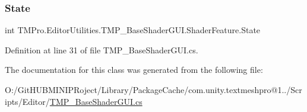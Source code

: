 \subsubsection{\texorpdfstring{State}{State}}
{\footnotesize\ttfamily int T\+M\+Pro.\+Editor\+Utilities.\+T\+M\+P\+\_\+\+Base\+Shader\+G\+U\+I.\+Shader\+Feature.\+State\hspace{0.3cm}{\ttfamily [get]}}



Definition at line 31 of file T\+M\+P\+\_\+\+Base\+Shader\+G\+U\+I.\+cs.



The documentation for this class was generated from the following file\+:\begin{DoxyCompactItemize}
\item 
O\+:/\+Git\+H\+U\+B\+M\+I\+N\+I\+P\+Roject/\+Library/\+Package\+Cache/com.\+unity.\+textmeshpro@1../\+Scripts/\+Editor/\mbox{\hyperlink{_t_m_p___base_shader_g_u_i_8cs}{T\+M\+P\+\_\+\+Base\+Shader\+G\+U\+I.\+cs}}\end{DoxyCompactItemize}
